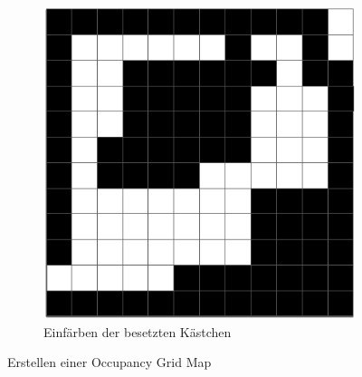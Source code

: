 \begin{figure}
  \begin{subfigure}[t]{.3\textwidth}
    \centering
    \includegraphics[width=.8\linewidth]{pic/vorwissen/2c_occupgridmap.png}
    \caption{Einfärben der besetzten Kästchen}
  \end{subfigure}
  \caption{Erstellen einer Occupancy Grid Map}
  \label{fig:occupanygridmap}
\end{figure}
\mbox{}